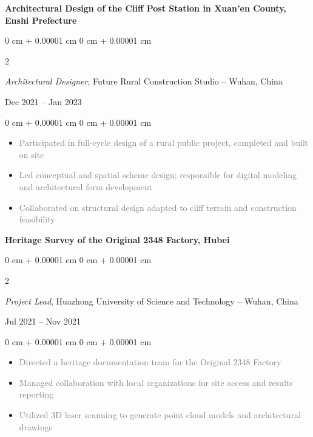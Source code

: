 \documentclass[10pt, letterpaper]{article}
\newenvironment{highlights}{
    \begin{itemize}[
        topsep=0.10 cm,
        parsep=0.10 cm,
        partopsep=0pt,
        itemsep=0pt,
        leftmargin=0 cm + 10pt
    ]
}{
    \end{itemize}
} %
\newenvironment{onecolentry}{
    \begin{adjustwidth}{
        0 cm + 0.00001 cm
    }{
        0 cm + 0.00001 cm
    }
}{
    \end{adjustwidth}
} %
\newenvironment{twocolentry}[2][]{
    \onecolentry
    \def\secondColumn{#2}
    \setcolumnwidth{\fill, 4.5 cm}
    \begin{paracol}{2}
}{
    \switchcolumn \raggedleft \secondColumn
    \end{paracol}
    \endonecolentry
} %
\begin{document}
    \textbf{Architectural Design of the Cliff Post Station in Xuan'en County, Enshi Prefecture} \\
    \begin{twocolentry}{
    Dec 2021 – Jan 2023
    }
    \textit{Architectural Designer}, Future Rural Construction Studio -- Wuhan, China
    \end{twocolentry}
    
    \vspace{0.10 cm}
    \begin{onecolentry}
    \begin{highlights}
        \item \textcolor{gray}{Participated in full-cycle design of a rural public project, completed and built on site}
        \item \textcolor{gray}{Led conceptual and spatial scheme design; responsible for digital modeling and architectural form development}
        \item \textcolor{gray}{Collaborated on structural design adapted to cliff terrain and construction feasibility}
    \end{highlights}
    \end{onecolentry}

    \vspace{0.2 cm}

    
    \textbf{Heritage Survey of the Original 2348 Factory, Hubei} \\
    \begin{twocolentry}{
    Jul 2021 – Nov 2021
    }
    \textit{Project Lead}, Huazhong University of Science and Technology -- Wuhan, China
    \end{twocolentry}
    
    \vspace{0.10 cm}
    \begin{onecolentry}
    \begin{highlights}
        \item \textcolor{gray}{Directed a heritage documentation team for the Original 2348 Factory}
        \item \textcolor{gray}{Managed collaboration with local organizations for site access and results reporting}
        \item \textcolor{gray}{Utilized 3D laser scanning to generate point cloud models and architectural drawings}
    \end{highlights}
    \end{onecolentry}
    
    \vspace{0.2 cm}
    
\end{document}
